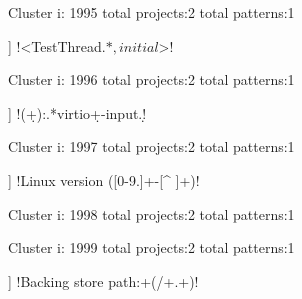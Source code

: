 Cluster i: 1995
total projects:2
total patterns:1
\begin{multicols}{1}
\begin{description}[noitemsep,topsep=0pt]
\item [[2] ] \cverb!<TestThread\(.*, initial\)>!
\end{description}
\end{multicols}







Cluster i: 1996
total projects:2
total patterns:1
\begin{multicols}{1}
\begin{description}[noitemsep,topsep=0pt]
\item [[2] ] \cverb!(\d+):.*virtio\d+-input.\d!
\end{description}
\end{multicols}







Cluster i: 1997
total projects:2
total patterns:1
\begin{multicols}{1}
\begin{description}[noitemsep,topsep=0pt]
\item [[2] ] \cverb!Linux version ([0-9.]+-[^ ]+)!
\end{description}
\end{multicols}







Cluster i: 1998
total projects:2
total patterns:1
\begin{multicols}{1}
\end{multicols}







Cluster i: 1999
total projects:2
total patterns:1
\begin{multicols}{1}
\begin{description}[noitemsep,topsep=0pt]
\item [[2] ] \cverb!Backing store path:\s+(/+.+)!
\end{description}
\end{multicols}







